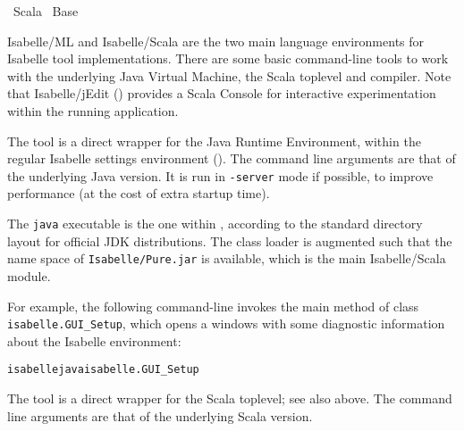 %
\begin{isabellebody}%
\def\isabellecontext{Scala}%
%
\isadelimtheory
%
\endisadelimtheory
%
\isatagtheory
{}\isamarkupfalse%
\ Scala\isanewline
{}\ Base\isanewline
{}%
\endisatagtheory
{\isafoldtheory}%
%
\isadelimtheory
%
\endisadelimtheory
%
\isamarkuptrue%
%
\begin{isamarkuptext}%
Isabelle/ML and Isabelle/Scala are the two main language
environments for Isabelle tool implementations.  There are some basic
command-line tools to work with the underlying Java Virtual Machine,
the Scala toplevel and compiler.  Note that Isabelle/jEdit
() provides a Scala Console for interactive
experimentation within the running application.%
\end{isamarkuptext}%
\isamarkuptrue%
%
\isamarkuptrue%
%
\begin{isamarkuptext}%
The \hypertarget{tool.java}{\hyperlink{tool.java}{\mbox{}}} tool is a direct wrapper for the Java
  Runtime Environment, within the regular Isabelle settings
  environment ().  The command line arguments are
  that of the underlying Java version.  It is run in \verb|-server| mode if possible, to improve performance (at the cost of
  extra startup time).

  The \verb|java| executable is the one within \hyperlink{setting.ISABELLE-JDK-HOME}{\mbox{}}, according to the standard directory layout for
  official JDK distributions.  The class loader is augmented such that
  the name space of \verb|Isabelle/Pure.jar| is available,
  which is the main Isabelle/Scala module.

  For example, the following command-line invokes the main method of
  class \verb|isabelle.GUI_Setup|, which opens a windows with
  some diagnostic information about the Isabelle environment:
\begin{alltt}
  isabelle java isabelle.GUI_Setup
\end{alltt}%
\end{isamarkuptext}%
\isamarkuptrue%
%
\isamarkuptrue%
%
\begin{isamarkuptext}%
The \hypertarget{tool.scala}{\hyperlink{tool.scala}{\mbox{}}} tool is a direct wrapper for the Scala
  toplevel; see also \hyperlink{tool.java}{\mbox{}} above.  The command line arguments
  are that of the underlying Scala version.


\end{isamarkuptext}
\end{isabellebody}
